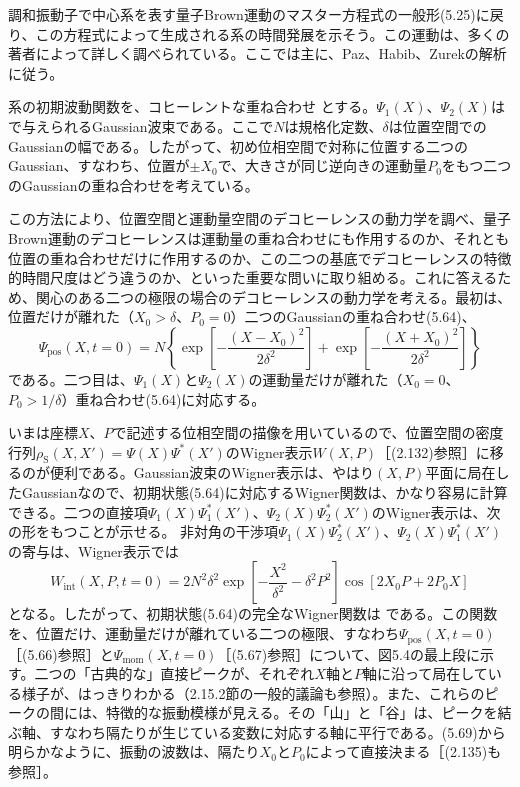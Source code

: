 調和振動子で中心系を表す量子Brown運動のマスター方程式の一般形(5.25)に戻り、この方程式によって生成される系の時間発展を示そう。この運動は、多くの著者によって詳しく調べられている。ここでは主に、Paz、Habib、Zurek\cite{ref184}の解析に従う。

系の初期波動関数を、コヒーレントな重ね合わせ
とする。$\Psi_1(X)$、$\Psi_2(X)$は
で与えられるGaussian波束である。ここで$N$は規格化定数、$\delta$は位置空間でのGaussianの幅である。したがって、初め位相空間で対称に位置する二つのGaussian、すなわち、位置が$\pm X_0$で、大きさが同じ逆向きの運動量$P_0$をもつ二つのGaussianの重ね合わせを考えている。

この方法により、位置空間と運動量空間のデコヒーレンスの動力学を調べ、量子Brown運動のデコヒーレンスは運動量の重ね合わせにも作用するのか、それとも位置の重ね合わせだけに作用するのか、この二つの基底でデコヒーレンスの特徴的時間尺度はどう違うのか、といった重要な問いに取り組める。これに答えるため、関心のある二つの極限の場合のデコヒーレンスの動力学を考える\cite{ref184}。最初は、位置だけが離れた（$X_0>\delta$、$P_0=0$）二つのGaussianの重ね合わせ(5.64)、
\begin{equation}
\Psi_{\mathrm{pos}}(X,t=0)=N\left\{\exp\left[-\frac{(X-X_0)^2}{2\delta^2}\right]+\exp\left[-\frac{(X+X_0)^2}{2\delta^2}\right]\right\}
\tag{5.66}
\end{equation}
である。二つ目は、$\Psi_1(X)$と$\Psi_2(X)$の運動量だけが離れた（$X_0=0$、$P_0>1/\delta$）重ね合わせ(5.64)に対応する。

\hypertarget{srcpage:195}{}\label{srcpage:195}
いまは座標$X$、$P$で記述する位相空間の描像を用いているので、位置空間の密度行列$\rho_{\mathrm S}(X,X')=\Psi(X)\Psi^*(X')$のWigner表示$W(X,P)$［(2.132)参照］に移るのが便利である。Gaussian波束のWigner表示は、やはり$(X,P)$平面に局在したGaussianなので、初期状態(5.64)に対応するWigner関数は、かなり容易に計算できる。二つの直接項$\Psi_1(X)\Psi_1^*(X')$、$\Psi_2(X)\Psi_2^*(X')$のWigner表示は、次の形をもつことが示せる\cite{ref184}。
非対角の干渉項$\Psi_1(X)\Psi_2^*(X')$、$\Psi_2(X)\Psi_1^*(X')$の寄与は、Wigner表示では
\begin{equation}
W_{\mathrm{int}}(X,P,t=0)=2N^2\delta^2\exp\left[-\frac{X^2}{\delta^2}-\delta^2P^2\right]\cos[2X_0P+2P_0X]
\tag{5.69}
\end{equation}
となる。したがって、初期状態(5.64)の完全なWigner関数は
である。この関数を、位置だけ、運動量だけが離れている二つの極限、すなわち$\Psi_{\mathrm{pos}}(X,t=0)$［(5.66)参照］と$\Psi_{\mathrm{mom}}(X,t=0)$［(5.67)参照］について、図5.4の最上段に示す。二つの「古典的な」直接ピークが、それぞれ$X$軸と$P$軸に沿って局在している様子が、はっきりわかる（2.15.2節の一般的議論も参照）。また、これらのピークの間には、特徴的な振動模様が見える。その「山」と「谷」は、ピークを結ぶ軸、すなわち隔たりが生じている変数に対応する軸に平行である。(5.69)から明らかなように、振動の波数は、隔たり$X_0$と$P_0$によって直接決まる［(2.135)も参照］。

